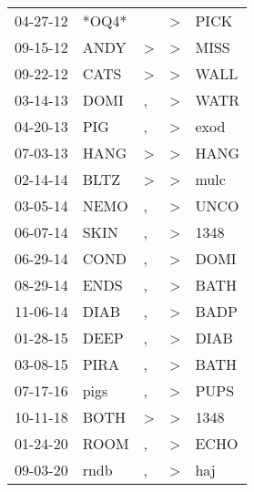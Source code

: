 \begin{supertabular}{lllll}
 04-27-12 &  *OQ4* &               &  \textgreater &  PICK \\
 09-15-12 &   ANDY &  \textgreater &  \textgreater &  MISS \\
 09-22-12 &   CATS &  \textgreater &  \textgreater &  WALL \\
 03-14-13 &   DOMI &             , &  \textgreater &  WATR \\
 04-20-13 &    PIG &             , &  \textgreater &  exod \\
 07-03-13 &   HANG &  \textgreater &  \textgreater &  HANG \\
 02-14-14 &   BLTZ &  \textgreater &  \textgreater &  mulc \\
 03-05-14 &   NEMO &             , &  \textgreater &  UNCO \\
 06-07-14 &   SKIN &             , &  \textgreater &  1348 \\
 06-29-14 &   COND &             , &  \textgreater &  DOMI \\
 08-29-14 &   ENDS &             , &  \textgreater &  BATH \\
 11-06-14 &   DIAB &             , &  \textgreater &  BADP \\
 01-28-15 &   DEEP &             , &  \textgreater &  DIAB \\
 03-08-15 &   PIRA &             , &  \textgreater &  BATH \\
 07-17-16 &   pigs &             , &  \textgreater &  PUPS \\
 10-11-18 &   BOTH &  \textgreater &  \textgreater &  1348 \\
 01-24-20 &   ROOM &             , &  \textgreater &  ECHO \\
 09-03-20 &   rndb &             , &  \textgreater &   haj \\
\end{supertabular}
